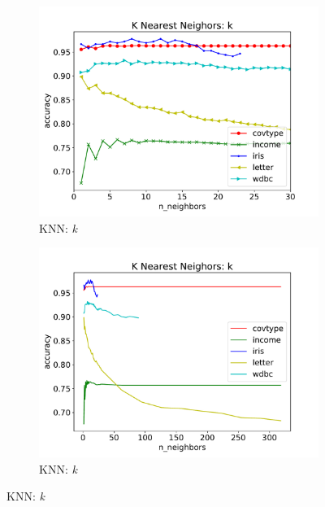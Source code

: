 \documentclass[twoside,11pt]{article}
\begin{document}
			\begin{figure}[h]
				\begin{framed}
					\centering
					
					\begin{subfigure}[b]{.49\linewidth}
						\includegraphics[width=\linewidth]{knn_hyperparam_zoomed}
						\caption{KNN: \textit{k}}
						\label{fig:hyperparam_knn_zoomed}
					\end{subfigure}
					\begin{subfigure}[b]{.49\linewidth}
						\includegraphics[width=\linewidth]{knn_hyperparam_all}
						\caption{KNN: \textit{k}}
						\label{fig:hyperparam_knn_all}
					\end{subfigure}
				

\end{framed}
\end{figure}
\end{document}
